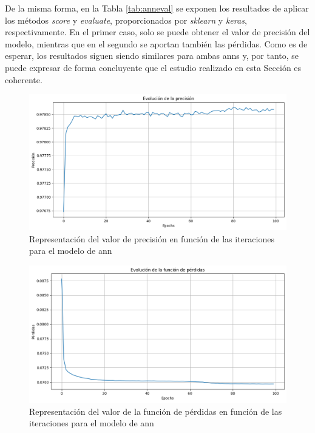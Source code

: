 \vspace{3mm}

De la misma forma, en la Tabla \ref{tab:anneval} se exponen los resultados de aplicar los métodos \textit{score} y \textit{evaluate}, proporcionados por \textit{sklearn} y \textit{keras}, respectivamente. En el primer caso, solo se puede obtener el valor de precisión del modelo, mientras que en el segundo se aportan también las pérdidas. Como es de esperar, los resultados siguen siendo similares para ambas \gls{ann}s y, por tanto, se puede expresar de forma concluyente que el estudio realizado en esta Sección es coherente.

\vspace{3mm}

\begin{figure}[H]
  \centering
  \includegraphics[width=1\textwidth]{img/desarrollo/ann/3annacc.png}
  \caption{Representación del valor de precisión en función de las iteraciones para el modelo de \acrshort{ann}}
  \label{fig:3annacc}
\end{figure}

\begin{figure}[H]
  \centering
  \includegraphics[width=1\textwidth]{img/desarrollo/ann/3annloss.png}
  \caption{Representación del valor de la función de pérdidas en función de las iteraciones para el modelo de \acrshort{ann}}
  \label{fig:3annloss}
\end{figure}

